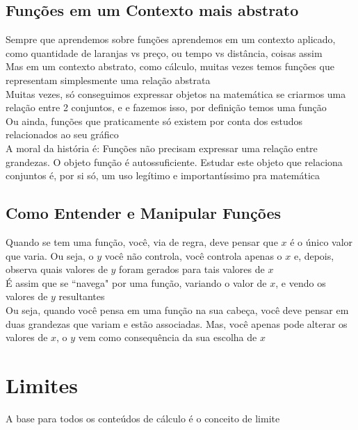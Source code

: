 \documentclass{article}
\begin{document}
\subsection{Funções em um Contexto mais abstrato}
Sempre que aprendemos sobre funções aprendemos em um contexto aplicado, como quantidade de laranjas vs preço, ou tempo vs distância, coisas assim
\\[2pt]
Mas em um contexto abstrato, como cálculo, muitas vezes temos funções que representam simplesmente uma relação abstrata
\\[2pt]
Muitas vezes, só conseguimos expressar objetos na matemática se criarmos uma relação entre 2 conjuntos, e e fazemos isso, por definição temos uma função
\\[5pt]
Ou ainda, funções que praticamente só existem por conta dos estudos relacionados ao seu gráfico
\\[5pt]
A moral da história é: Funções não precisam expressar uma relação entre grandezas. O objeto função é autossuficiente. Estudar este objeto que relaciona conjuntos é, por si só, um uso legítimo e importantíssimo pra matemática

\subsection{Como Entender e Manipular Funções}
Quando se tem uma função, você, via de regra, deve pensar que $x$ é o único valor que varia. Ou seja, o $y$ você não controla, você controla apenas o $x$ e, depois, observa quais valores de $y$ foram gerados para tais valores de $x$
\\[2pt]
É assim que se ``navega" por uma função, variando o valor de $x$, e vendo os valores de $y$ resultantes
\\[5pt]
Ou seja, quando você pensa em uma função na sua cabeça, você deve pensar em duas grandezas que variam e estão associadas. Mas, você apenas pode alterar os valores de $x$, o $y$ vem como consequência da sua escolha de $x$

\section{Limites}
A base para todos os conteúdos de cálculo é o conceito de limite
\end{document}
